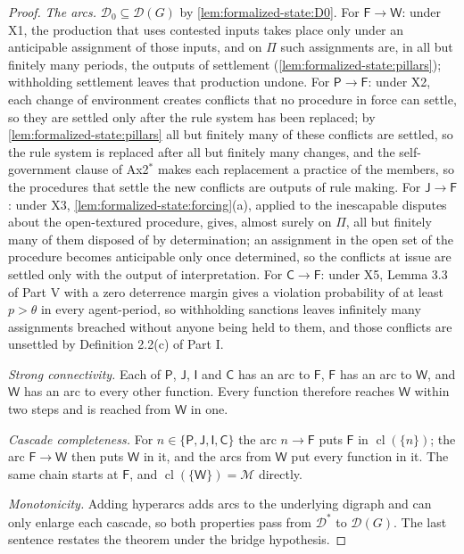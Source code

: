 \documentclass[11pt,letterpaper]{article}
\theoremstyle{definition}
\theoremstyle{remark}
\newcommand{\pF}{\mathsf{F}}
\newcommand{\pP}{\mathsf{P}}
\newcommand{\pJ}{\mathsf{J}}
\newcommand{\pI}{\mathsf{I}}
\newcommand{\pC}{\mathsf{C}}
\newcommand{\pW}{\mathsf{W}}
\newcommand{\Mset}{\mathcal{M}}
\newcommand{\Dzero}{\mathcal{D}_0}
\newcommand{\Dstar}{\mathcal{D}^{*}}
\newcommand{\cl}{\operatorname{cl}}
\begin{document}
\begin{proof}
\emph{The arcs.} $\Dzero\subseteq\mathcal{D}(G)$ by \cref{lem:formalized-state:D0}. For $\pF\to\pW$: under X1, the production that uses contested inputs takes place only under an anticipable assignment of those inputs, and on $\Pi$ such assignments are, in all but finitely many periods, the outputs of settlement (\cref{lem:formalized-state:pillars}); withholding settlement leaves that production undone. For $\pP\to\pF$: under X2, each change of environment creates conflicts that no procedure in force can settle, so they are settled only after the rule system has been replaced; by \cref{lem:formalized-state:pillars} all but finitely many of these conflicts are settled, so the rule system is replaced after all but finitely many changes, and the self-government clause of Ax2$^{*}$ makes each replacement a practice of the members, so the procedures that settle the new conflicts are outputs of rule making. For $\pJ\to\pF$: under X3, \cref{lem:formalized-state:forcing}(a), applied to the inescapable disputes about the open-textured procedure, gives, almost surely on $\Pi$, all but finitely many of them disposed of by determination; an assignment in the open set of the procedure becomes anticipable only once determined, so the conflicts at issue are settled only with the output of interpretation. For $\pC\to\pF$: under X5, Lemma 3.3 of Part V with a zero deterrence margin gives a violation probability of at least $p>\theta$ in every agent-period, so withholding sanctions leaves infinitely many assignments breached without anyone being held to them, and those conflicts are unsettled by Definition 2.2(c) of Part I.

\emph{Strong connectivity.} Each of $\pP$, $\pJ$, $\pI$ and $\pC$ has an arc to $\pF$, $\pF$ has an arc to $\pW$, and $\pW$ has an arc to every other function. Every function therefore reaches $\pW$ within two steps and is reached from $\pW$ in one.

\emph{Cascade completeness.} For $n\in\{\pP,\pJ,\pI,\pC\}$ the arc $n\to\pF$ puts $\pF$ in $\cl(\{n\})$; the arc $\pF\to\pW$ then puts $\pW$ in it, and the arcs from $\pW$ put every function in it. The same chain starts at $\pF$, and $\cl(\{\pW\})=\Mset$ directly.

\emph{Monotonicity.} Adding hyperarcs adds arcs to the underlying digraph and can only enlarge each cascade, so both properties pass from $\Dstar$ to $\mathcal{D}(G)$. The last sentence restates the theorem under the bridge hypothesis.
\end{proof}
\end{document}
